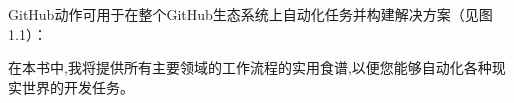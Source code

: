 GitHub动作可用于在整个GitHub生态系统上自动化任务并构建解决方案（见图1.1）：


在本书中,我将提供所有主要领域的工作流程的实用食谱,以便您能够自动化各种现实世界的开发任务。















